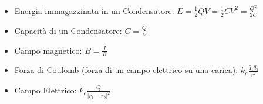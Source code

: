 \documentclass[14pt]{extarticle}
\begin{document}
\begin{itemize}
    \item Energia immagazzinata in un Condensatore: $E=\frac{1}{2}QV=\frac{1}{2}CV^2=\frac{Q^2}{2C}$
    \item Capacità di un Condensatore: $C=\frac{Q}{V}$
    \item Campo magnetico: $B=\frac{I}{R}$
\end{itemize}

\begin{itemize}
    \item Forza di Coulomb (forza di un campo elettrico su una carica): $k_e\frac{q_1q_2}{r^2}$
    \item Campo Elettrico: $k_e\frac{Q}{|r_1-r_2|^2}$
    
\end{itemize}
\end{document}
